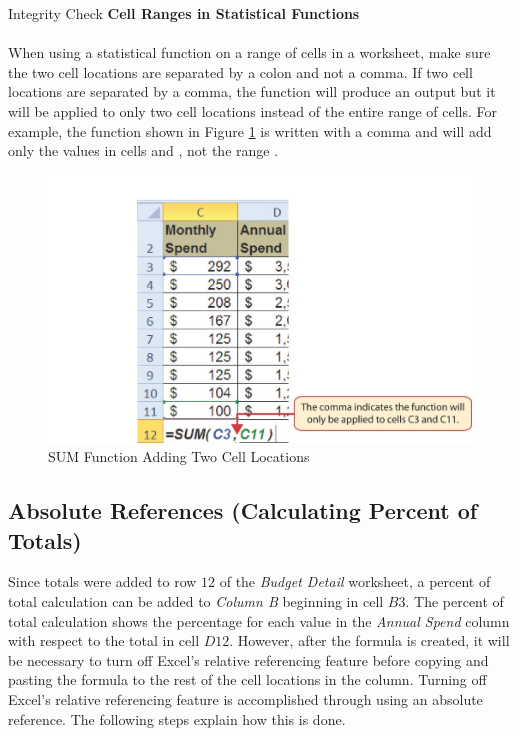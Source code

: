 \begin{center}
	\begin{infobox}{Integrity Check}
		\textbf{Cell Ranges in Statistical Functions}
		\\
		\\
		When using a statistical function on a range of cells in a worksheet, make sure the two cell locations are separated by a colon and not a comma. If two cell locations are separated by a comma, the function will produce an output but it will be applied to only two cell locations instead of the entire range of cells. For example, the  function shown in Figure \ref{02:fig13} is written with a comma and will add only the values in cells  and , not the range .
	\end{infobox}
\end{center}

\begin{figure}[H]
	\centering
	\includegraphics[width=\maxwidth{.95\linewidth}]{gfx/ch02_fig13}
	\caption{SUM Function Adding Two Cell Locations}
	\label{02:fig13}
\end{figure}

\subsection{Absolute References (Calculating Percent of Totals)}

Since totals were added to row $ 12 $ of the \textit{Budget Detail} worksheet, a percent of total calculation can be added to \textit{Column B} beginning in cell $ B3 $. The percent of total calculation shows the percentage for each value in the \textit{Annual Spend} column with respect to the total in cell $ D12 $. However, after the formula is created, it will be necessary to turn off Excel's relative referencing feature before copying and pasting the formula to the rest of the cell locations in the column. Turning off Excel's relative referencing feature is accomplished through using an absolute reference. The following steps explain how this is done.

